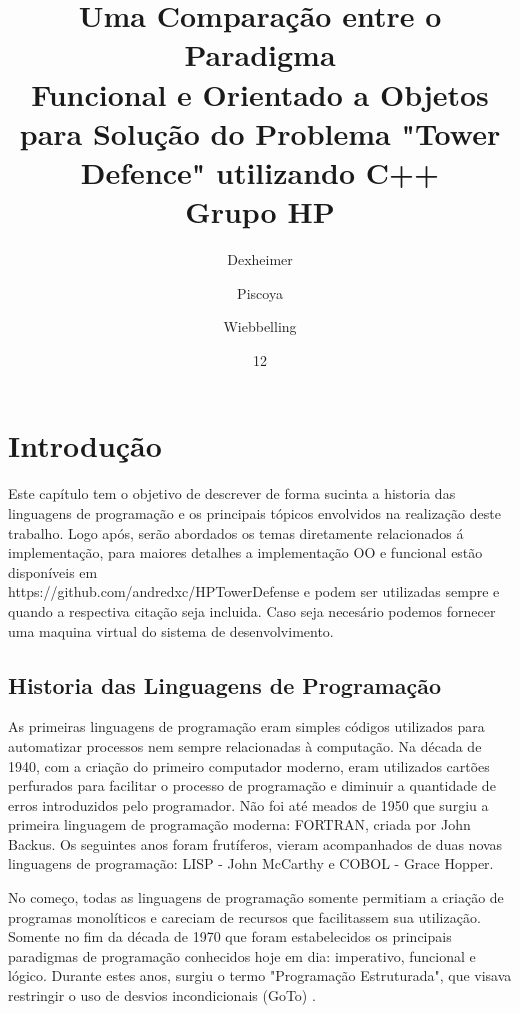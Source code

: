 \documentclass[rel_mlp]{iiufrgs}
\title{Uma Comparação entre o Paradigma\\ Funcional e Orientado a Objetos para Solução do Problema "Tower Defence" utilizando C++ \\ \vspace{0.4cm} Grupo HP}
\author{Dexheimer}{André}
\author{Piscoya}{Gabriel}
\author{Wiebbelling}{Rodrigo}
\date{12}{2017}
\begin{document}
\maketitle      


\tableofcontents









\chapter{Introdução} \label{intro}
Este capítulo tem o objetivo de descrever de forma sucinta a historia das linguagens de programação e os principais tópicos envolvidos na realização deste trabalho. Logo após, serão abordados os temas diretamente relacionados á implementação, para maiores detalhes a implementação OO e funcional estão disponíveis em \\ https://github.com/andredxc/HPTowerDefense e podem ser utilizadas sempre e quando a respectiva citação seja incluida. 
Caso seja necesário podemos fornecer uma maquina virtual do sistema de desenvolvimento. 
\section{Historia das Linguagens de Programação}
As primeiras linguagens de programação eram simples códigos utilizados para automatizar processos nem sempre relacionadas à computação. Na década de 1940, com a criação do primeiro computador moderno, eram utilizados cartões perfurados para facilitar o processo de programação e diminuir a quantidade de erros introduzidos pelo programador. Não foi até meados de 1950 que surgiu a primeira linguagem de programação moderna: FORTRAN, criada por John Backus. Os seguintes anos foram frutíferos, vieram acompanhados de duas novas linguagens de programação: LISP - John McCarthy e COBOL - Grace Hopper.

No começo, todas as linguagens de programação somente permitiam a criação de programas monolíticos e careciam de recursos que facilitassem sua utilização. Somente no fim da década de 1970 que foram estabelecidos os principais paradigmas de programação conhecidos hoje em dia: imperativo, funcional e lógico.
Durante estes anos, surgiu o termo "Programação Estruturada", que visava restringir o uso de desvios incondicionais (GoTo) \cite{organick2014programming}.
\end{document}
